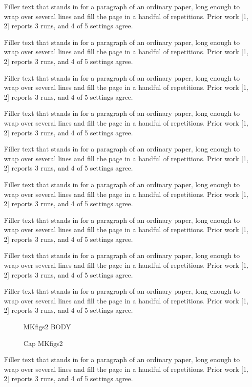\documentclass{article}
\begin{document}
Filler text that stands in for a paragraph of an ordinary paper, long enough to wrap over several lines and fill the page in a handful of repetitions. Prior work [1, 2] reports 3 runs, and 4 of 5 settings agree.\par
Filler text that stands in for a paragraph of an ordinary paper, long enough to wrap over several lines and fill the page in a handful of repetitions. Prior work [1, 2] reports 3 runs, and 4 of 5 settings agree.\par
Filler text that stands in for a paragraph of an ordinary paper, long enough to wrap over several lines and fill the page in a handful of repetitions. Prior work [1, 2] reports 3 runs, and 4 of 5 settings agree.\par
Filler text that stands in for a paragraph of an ordinary paper, long enough to wrap over several lines and fill the page in a handful of repetitions. Prior work [1, 2] reports 3 runs, and 4 of 5 settings agree.\par
Filler text that stands in for a paragraph of an ordinary paper, long enough to wrap over several lines and fill the page in a handful of repetitions. Prior work [1, 2] reports 3 runs, and 4 of 5 settings agree.\par
Filler text that stands in for a paragraph of an ordinary paper, long enough to wrap over several lines and fill the page in a handful of repetitions. Prior work [1, 2] reports 3 runs, and 4 of 5 settings agree.\par
Filler text that stands in for a paragraph of an ordinary paper, long enough to wrap over several lines and fill the page in a handful of repetitions. Prior work [1, 2] reports 3 runs, and 4 of 5 settings agree.\par
Filler text that stands in for a paragraph of an ordinary paper, long enough to wrap over several lines and fill the page in a handful of repetitions. Prior work [1, 2] reports 3 runs, and 4 of 5 settings agree.\par
Filler text that stands in for a paragraph of an ordinary paper, long enough to wrap over several lines and fill the page in a handful of repetitions. Prior work [1, 2] reports 3 runs, and 4 of 5 settings agree.\par
\begin{figure}[t]\centering MKfigs2 BODY\caption{Cap MKfigs2}\label{fig:s2}\end{figure}
Filler text that stands in for a paragraph of an ordinary paper, long enough to wrap over several lines and fill the page in a handful of repetitions. Prior work [1, 2] reports 3 runs, and 4 of 5 settings agree.\par
\end{document}
